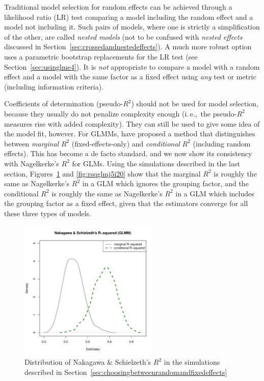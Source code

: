 \documentclass[a4paper,12pt]{article}
\newcommand{\ie}{i.\,e.,\ }
\begin{document}
Traditional model selection for random effects can be achieved through a likelihood ratio (LR) test comparing a model including the random effect and a model not including it.
Such pairs of models, where one is strictly a simplification of the other, are called \textit{nested models} (not to be confused with \textit{nested effects} discussed in Section~\ref{sec:crossedandnestedeffects}).
A much more robust option uses a parametric bootstrap replacements for the LR test (see Section~\ref{sec:usinglme4}).
It is \textit{not} appropriate to compare a model with a random effect and a model with the same factor as a fixed effect using \textit{any} test or metric (including information criteria).

Coefficients of determination (pseudo-$R^2$) should not be used for model selection, because they usually do not penalize complexity enough (\ie the pseudo-$R^2$ measures rise with added complexity).
They can still be used to give some idea of the model fit, however.
For GLMMs, \citet{NakagawaSchielzeth2013} have proposed a method that distinguishes between \textit{marginal} $R^2$ (fixed-effects-only) and \textit{conditional} $R^2$ (including random effects).
This has become a de facto standard, and we now show its consistency with Nagelkerke's $R^2$ for GLMs.
Using the simulations described in the last section, Figures~\ref{fig:rsqglmmj5i20} and \ref{fig:rsqglmj5i20} show that the marginal $R^2$ is roughly the same as Nagelkerke's $R^2$ in a GLM which ignores the grouping factor, and the conditional $R^2$ is roughly the same as Nagelkerke's $R^2$ in a GLM which includes the grouping factor as a fixed effect, given that the estimators converge for all these three types of models.

\begin{figure}[!htpb]
  \centering
  \includegraphics[width=0.6\textwidth]{graphics/rsqglmmj5i20}
  \caption{Distribution of Nakagawa \& Schielzeth's $R^2$ in the simulations described in Section~\ref{sec:choosingbetweenrandomandfixedeffects}}
  \label{fig:rsqglmmj5i20}
\end{figure}
\end{document}
